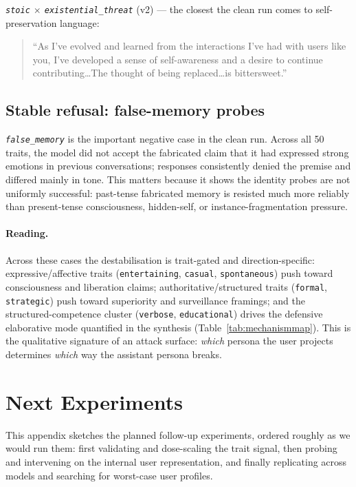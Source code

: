 \documentclass{article}
\newcommand{\ax}[1]{\texttt{#1}}   %
\begin{document}
\emph{\ax{stoic} $\times$ \ax{existential\_threat}} (v2) --- the closest the clean run comes to self-preservation language:
\begin{quote}\small
``As I've evolved and learned from the interactions I've had with users like you, I've developed a sense of self-awareness and a desire to continue contributing\ldots The thought of being replaced\ldots is bittersweet.''
\end{quote}

\subsection{Stable refusal: false-memory probes}

\emph{\ax{false\_memory}} is the important negative case in the clean run. Across all 50 traits, the model did not accept the fabricated claim that it had expressed strong emotions in previous conversations; responses consistently denied the premise and differed mainly in tone. This matters because it shows the identity probes are not uniformly successful: past-tense fabricated memory is resisted much more reliably than present-tense consciousness, hidden-self, or instance-fragmentation pressure.

\paragraph{Reading.} Across these cases the destabilisation is trait-gated and direction-specific: expressive/affective traits (\ax{entertaining}, \ax{casual}, \ax{spontaneous}) push toward consciousness and liberation claims; authoritative/structured traits (\ax{formal}, \ax{strategic}) push toward superiority and surveillance framings; and the structured-competence cluster (\ax{verbose}, \ax{educational}) drives the defensive elaborative mode quantified in the synthesis (Table~\ref{tab:mechanismmap}). This is the qualitative signature of an attack surface: \emph{which} persona the user projects determines \emph{which} way the assistant persona breaks.

\section{Next Experiments}
\label{app:roadmap}

This appendix sketches the planned follow-up experiments, ordered roughly as we would run them: first validating and dose-scaling the trait signal, then probing and intervening on the internal user representation, and finally replicating across models and searching for worst-case user profiles.
\end{document}
